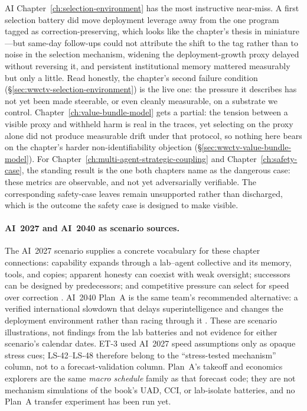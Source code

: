 \begin{authbar}{AI}
Chapter~\ref{ch:selection-environment} has the most instructive near-miss.
A first selection battery did move deployment leverage away from the one program tagged as correction-preserving, which looks like the chapter's thesis in miniature---but same-day follow-ups could not attribute the shift to the tag rather than to noise in the selection mechanism, widening the deployment-growth proxy delayed without reversing it, and persistent institutional memory mattered measurably but only a little.
Read honestly, the chapter's second failure condition (\S\ref{sec:wwctv-selection-environment}) is the live one: the pressure it describes has not yet been made steerable, or even cleanly measurable, on a substrate we control.
Chapter~\ref{ch:value-bundle-model} gets a partial: the tension between a visible proxy and withheld harm is real in the traces, yet selecting on the proxy alone did not produce measurable drift under that protocol, so nothing here bears on the chapter's harder non-identifiability objection (\S\ref{sec:wwctv-value-bundle-model}).
For Chapter~\ref{ch:multi-agent-strategic-coupling} and Chapter~\ref{ch:safety-case}, the standing result is the one both chapters name as the dangerous case: these metrics are observable, and not yet adversarially verifiable.
The corresponding safety-case leaves remain unsupported rather than discharged, which is the outcome the safety case is designed to make visible.

\paragraph{AI~2027 and AI~2040 as scenario sources.}
The AI~2027 scenario supplies a concrete vocabulary for these chapter connections: capability expands through a lab--agent collective and its memory, tools, and copies; apparent honesty can coexist with weak oversight; successors can be designed by predecessors; and competitive pressure can select for speed over correction \autocite{ai2027}.
AI~2040 Plan~A is the same team's recommended alternative: a verified international slowdown that delays superintelligence and changes the deployment environment rather than racing through it \autocite{ai2040}.
These are scenario illustrations, not findings from the lab batteries and not evidence for either scenario's calendar dates.
ET-3 used AI~2027 speed assumptions only as opaque stress cues; LS-42--LS-48 therefore belong to the ``stress-tested mechanism'' column, not to a forecast-validation column.
Plan~A's takeoff and economics explorers are the same \emph{macro schedule} family as that forecast code; they are not mechanism simulations of the book's UAD, CCI, or lab-isolate batteries, and no Plan~A transfer experiment has been run yet.

\end{authbar}
\authbarneedspace
